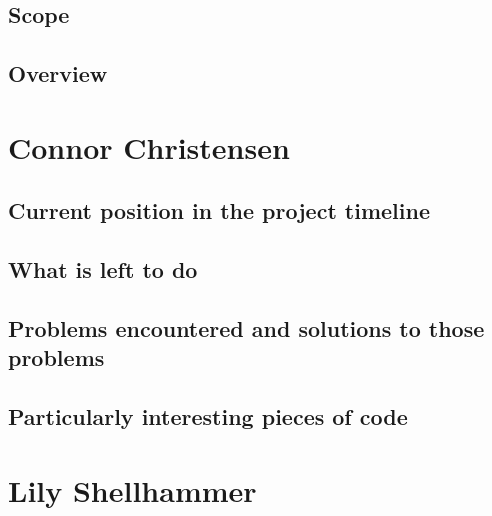 \documentclass[draftclsnofoot,onecolumn,letterpaper,10pt,compsoc]{IEEEtran}
\begin{document}
\subsection{Scope}

\subsection{Overview}

\section{Connor Christensen}
\subsection{Current position in the project timeline}
\subsection{What is left to do}
\subsection{Problems encountered and solutions to those problems}
\subsection{Particularly interesting pieces of code}


\section{Lily Shellhammer}
\end{document}
